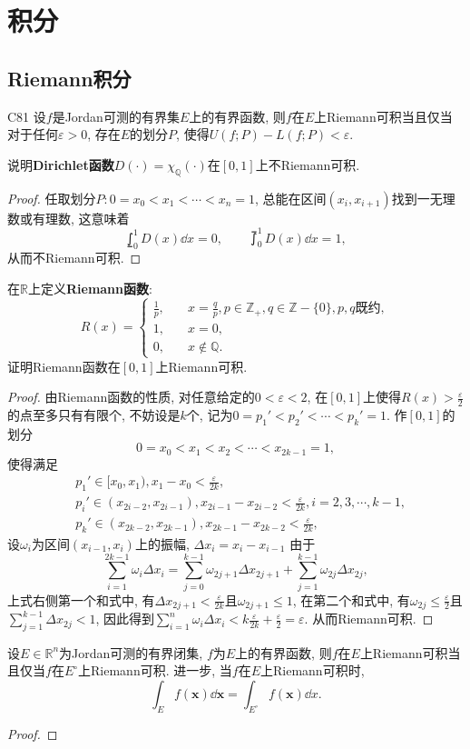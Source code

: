 \chapter{积分}
\section{Riemann积分}
\begin{theorem}{}{C81}
设\(f\)是Jordan可测的有界集\(E\)上的有界函数, 则\(f\)在\(E\)上Riemann可积当且仅当对于任何\(\varepsilon>0\), 存在\(E\)的划分\(P\), 使得\(U(f;P) - L(f;P)<\varepsilon.\)
\end{theorem}
\begin{quiza}
\woe 说明\textbf{Dirichlet函数}\(D(\cdot)=\chi_{\mathbb{Q}}(\cdot)\)在\([0,1]\)上不Riemann可积.
\begin{proof}
	任取划分\(P:0=x_0<x_1<\cdots<x_n=1\), 总能在区间\((x_{i},x_{i+1})\)找到一无理数或有理数, 这意味着\[\lowint_0^1D(x)\dd x=0,\qquad\upint_0^1D(x)\dd x=1,\]从而不Riemann可积.
\end{proof}
\woe 在\(\mathbb{R}\)上定义\textbf{Riemann函数}:\[R(x)=\begin{cases}
          \frac{1}{p},\quad &x=\frac{q}{p},p\in \mathbb{Z}_+,q\in\mathbb{Z}-\{0\},p,q\text{既约},\\
          1,&x=0,\\
          0,&x\notin \mathbb{Q}.
\end{cases}\]证明Riemann函数在\([0,1]\)上Riemann可积.
\begin{proof}
	由Riemann函数的性质, 对任意给定的\(0<\varepsilon<2\), 在\([0,1]\)上使得\(R(x)>\frac{\varepsilon}{2}\)的点至多只有有限个, 不妨设是\(k\)个, 记为\(0=p_1'<p_2'<\cdots<p_k'=1\). 作\([0,1]\)的划分\[0=x_0<x_1<x_2<\cdots<x_{2k-1}=1,\]使得满足\[\begin{split}
		&p_1'\in[x_0,x_1),x_1-x_0<\frac{\varepsilon}{2k},\\
		&p_i'\in(x_{2i-2},x_{2i-1}),x_{2i-1}-x_{2i-2}<\frac{\varepsilon}{2k},i=2,3,\cdots,k-1,\\
		&p_k'\in(x_{2k-2},x_{2k-1}),x_{2k-1}-x_{2k-2}<\frac{\varepsilon}{2k},
	\end{split}\]
设\(\omega_i\)为区间\((x_{i-1},x_i)\)上的振幅, \(\Delta x_i=x_i-x_{i-1}\) 由于\[\sum_{i=1}^{2k-1}\omega_i\Delta x_i=\sum_{j=0}^{k-1}\omega_{2j+1}\Delta x_{2j+1}+\sum_{j=1}^{k-1}\omega_{2j}\Delta x_{2j},\]上式右侧第一个和式中, 有\(\Delta x_{2j+1}<\frac{\varepsilon}{2k}\)且\(\omega_{2j+1}\leqslant 1\), 在第二个和式中, 有\(\omega_{2j}\leqslant\frac{\varepsilon}{2}\)且\(\sum_{j=1}^{k-1}\Delta x_{2j}<1\), 因此得到\(\sum_{i=1}^{n}\omega_i\Delta x_i<k\frac{\varepsilon}{2k}+\frac{\varepsilon}{2}=\varepsilon\). 从而Riemann可积.
\end{proof}
\woe 设\(E\in\mathbb{R}^n\)为Jordan可测的有界闭集, \(f\)为\(E\)上的有界函数, 则\(f\)在\(E\)上Riemann可积当且仅当\(f\)在\(E^{\circ}\)上Riemann可积. 进一步, 当\(f\)在\(E\)上Riemann可积时,\[\int_E f(\boldsymbol{x})\dd\boldsymbol{x}=\int_{E^\circ}f(\boldsymbol{x})\dd x.\]
\begin{proof}
	

\end{proof}
\end{quiza}
